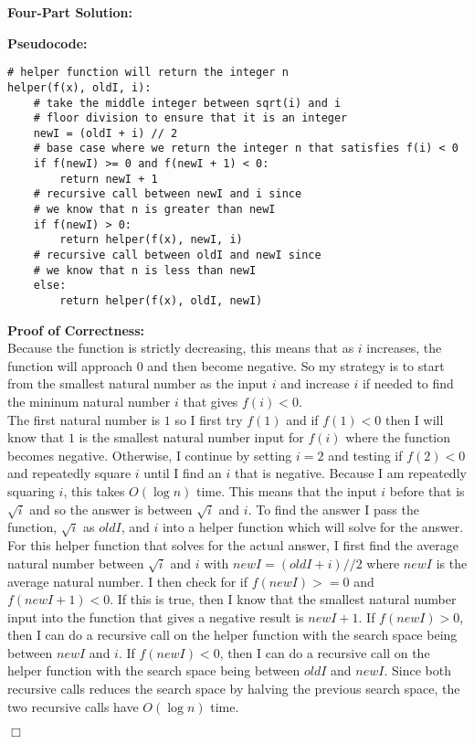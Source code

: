 \documentclass[11pt]{article}
\def\endproofmark{$\Box$}
\newenvironment{FourPartSolution}{\par{\bf Four-Part Solution:}}{\smallskip}
\newenvironment{pseudocode}{\par{\bf Pseudocode:}}{\smallskip}
\newenvironment{proofOfCorrectness}{\par{\bf Proof of Correctness:}}{\endproofmark\smallskip}
\begin{document}
\begin{FourPartSolution}
\begin{pseudocode}
\begin{lstlisting}
# helper function will return the integer n
helper(f(x), oldI, i):
	# take the middle integer between sqrt(i) and i
	# floor division to ensure that it is an integer
	newI = (oldI + i) // 2
	# base case where we return the integer n that satisfies f(i) < 0
	if f(newI) >= 0 and f(newI + 1) < 0:
		return newI + 1
	# recursive call between newI and i since
	# we know that n is greater than newI
	if f(newI) > 0:
		return helper(f(x), newI, i)
	# recursive call between oldI and newI since
	# we know that n is less than newI
	else:
		return helper(f(x), oldI, newI)
\end{lstlisting}
\end{pseudocode}
\begin{proofOfCorrectness}
\\
Because the function is strictly decreasing, this means that as $i$ increases, the function will approach $0$ and then become negative. So my strategy is to start from the smallest natural number as the input $i$ and increase $i$ if needed to find the mininum natural number $i$ that gives $f(i) < 0$.
\vspace*{1\baselineskip}
\\
The first natural number is $1$ so I first try $f(1)$ and if $f(1) < 0$ then I will know that $1$ is the smallest natural number input for $f(i)$ where the function becomes negative. Otherwise, I continue by setting $i = 2$ and testing if $f(2) < 0$ and repeatedly square $i$ until I find an $i$ that is negative. Because I am repeatedly squaring $i$, this takes $O(\log{n})$ time. This means that the input $i$ before that is $\sqrt{i}$ and so the answer is between $\sqrt{i}$ and $i$. To find the answer I pass the function, $\sqrt{i}$ as $oldI$, and $i$ into a helper function which will solve for the answer.
\vspace*{1\baselineskip}
\\
For this helper function that solves for the actual answer, I first find the average natural number between $\sqrt{i}$ and $i$ with $newI = (oldI + i) // 2$ where $newI$ is the average natural number. I then check for if $f(newI) >= 0$ and $f(newI + 1) < 0$. If this is true, then I know that the smallest natural number input into the function that gives a negative result is $newI + 1$. If $f(newI) > 0$, then I can do a recursive call on the helper function with the search space being between $newI$ and $i$. If $f(newI) < 0$, then I can do a recursive call on the helper function with the search space being between $oldI$ and $newI$. Since both recursive calls reduces the search space by halving the previous search space, the two recursive calls have $O(\log{n})$ time. 

\end{proofOfCorrectness}
\end{FourPartSolution}
\end{document}
